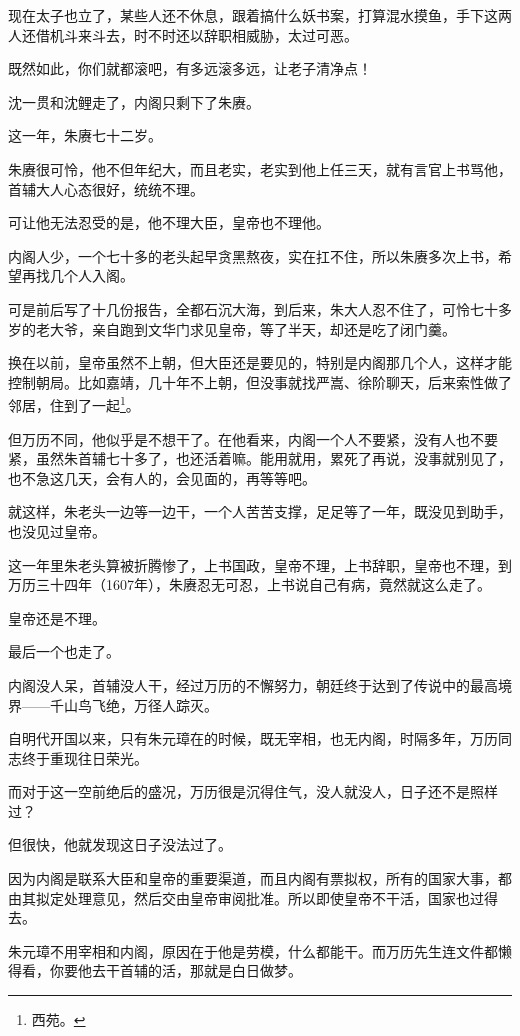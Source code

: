 \begin{multicols}{\theparacolNo}
现在太子也立了，某些人还不休息，跟着搞什么妖书案，打算混水摸鱼，手下这两人还借机斗来斗去，时不时还以辞职相威胁，太过可恶。

既然如此，你们就都滚吧，有多远滚多远，让老子清净点！

沈一贯和沈鲤走了，内阁只剩下了朱赓。

这一年，朱赓七十二岁。

朱赓很可怜，他不但年纪大，而且老实，老实到他上任三天，就有言官上书骂他，首辅大人心态很好，统统不理。

可让他无法忍受的是，他不理大臣，皇帝也不理他。

内阁人少，一个七十多的老头起早贪黑熬夜，实在扛不住，所以朱赓多次上书，希望再找几个人入阁。

可是前后写了十几份报告，全都石沉大海，到后来，朱大人忍不住了，可怜七十多岁的老大爷，亲自跑到文华门求见皇帝，等了半天，却还是吃了闭门羹。

换在以前，皇帝虽然不上朝，但大臣还是要见的，特别是内阁那几个人，这样才能控制朝局。比如嘉靖，几十年不上朝，但没事就找严嵩、徐阶聊天，后来索性做了邻居，住到了一起\footnote{西苑。}。

但万历不同，他似乎是不想干了。在他看来，内阁一个人不要紧，没有人也不要紧，虽然朱首辅七十多了，也还活着嘛。能用就用，累死了再说，没事就别见了，也不急这几天，会有人的，会见面的，再等等吧。

就这样，朱老头一边等一边干，一个人苦苦支撑，足足等了一年，既没见到助手，也没见过皇帝。

这一年里朱老头算被折腾惨了，上书国政，皇帝不理，上书辞职，皇帝也不理，到万历三十四年（1607年），朱赓忍无可忍，上书说自己有病，竟然就这么走了。

皇帝还是不理。

最后一个也走了。

内阁没人呆，首辅没人干，经过万历的不懈努力，朝廷终于达到了传说中的最高境界——千山鸟飞绝，万径人踪灭。

自明代开国以来，只有朱元璋在的时候，既无宰相，也无内阁，时隔多年，万历同志终于重现往日荣光。

而对于这一空前绝后的盛况，万历很是沉得住气，没人就没人，日子还不是照样过？

但很快，他就发现这日子没法过了。

因为内阁是联系大臣和皇帝的重要渠道，而且内阁有票拟权，所有的国家大事，都由其拟定处理意见，然后交由皇帝审阅批准。所以即使皇帝不干活，国家也过得去。

朱元璋不用宰相和内阁，原因在于他是劳模，什么都能干。而万历先生连文件都懒得看，你要他去干首辅的活，那就是白日做梦。


\end{multicols}
